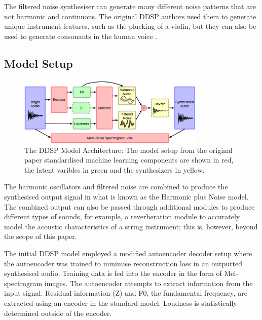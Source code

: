 \vspace{0.5cm}
\vspace{0.5cm}

The filtered noise synthesiser can generate many different noise patterns that are not harmonic and continuous. The original DDSP authors used them to generate unique instrument features, such as the plucking of a violin, but they can also be used to generate consonants in the human voice \cite{SingingDDSP}.

\subsection{Model Setup}

\begin{figure}[!ht]
    \centering
    \includegraphics[width=0.8\textwidth]{literature_review/DDSPArchitecture.png}
    \caption{The DDSP Model Architecture: The model setup from the original paper\cite{OriginalDDSP} standardised machine learning components are shown in red, the latent varibles in green and the synthesizers in yellow.}
    \label{fig:ddsp_model_setup}
\end{figure}

The harmonic oscillators and filtered noise are combined to produce the synthesised output signal in what is known as the Harmonic plus Noise model. The combined output can also be passed through additional modules to produce different types of sounds, for example, a reverberation module to accurately model the acoustic characteristics of a string instrument; this is, however, beyond the scope of this paper.

The initial DDSP model\cite{OriginalDDSP} employed a modified autoencoder decoder setup where the autoencoder was trained to minimise reconstruction loss in an outputted synthesised audio. Training data is fed into the encoder in the form of Mel-spectrogram images. The autoencoder attempts to extract information from the input signal. Residual information (Z) and F0, the fundamental frequency, are extracted using an encoder in the standard model. Loudness is statistically determined outside of the encoder.

